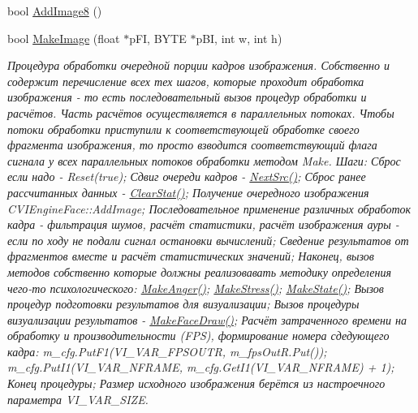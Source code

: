 \begin{DoxyCompactItemize}
bool \hyperlink{class_c_v_i_engine_base_a3fe6ae4f9ac6b9422c22d99878f424f5}{Add\+Image8} ()
\item 
bool \hyperlink{class_c_v_i_engine_base_a3426944a03bac2f5a8c135c217f9cf8c}{Make\+Image} (float $\ast$p\+F\+I, B\+Y\+T\+E $\ast$p\+B\+I, int w, int h)
\begin{DoxyCompactList}\small\item\em Процедура обработки очередной порции кадров изображения. Собственно и содержит перечисление всех тех шагов, которые проходит обработка изображения -\/ то есть последовательный вызов процедур обработки и расчётов. Часть расчётов осуществляется в параллельных потоках. Чтобы потоки обработки приступили к соответствующей обработке своего фрагмента изображения, то просто взводится соответствующий флага сигнала у всех параллельных потоков обработки методом Make. Шаги\+: Сброс если надо -\/ Reset(true); Сдвиг очереди кадров -\/ \hyperlink{class_c_v_i_engine_base_aa1aa2604f40dd77bc49ca6ff8fd81535}{Next\+Src()}; Сброс ранее рассчитанных данных -\/ \hyperlink{class_c_v_i_engine_base_a10d6138a2c8f4c4c946bf930c268be6b}{Clear\+Stat()}; Получение очередного изображения C\+V\+I\+Engine\+Face\+::\+Add\+Image; Последовательное применение различных обработок кадра -\/ фильтрация шумов, расчёт статистики, расчёт изображения ауры -\/ если по ходу не подали сигнал остановки вычислений; Сведение результатов от фрагментов вместе и расчёт статистических значений; Наконец, вызов методов собственно которые должны реализовавать методику определения чего-\/то психологического\+: \hyperlink{class_c_v_i_engine_base_adf949a2b1abf18f519937d3f787c5abf}{Make\+Anger()}; \hyperlink{class_c_v_i_engine_base_a746c67a403f60418bf26e1e686db0c0c}{Make\+Stress()}; \hyperlink{class_c_v_i_engine_base_aa77b261660041465a8d3e68a7088dd0d}{Make\+State()}; Вызов процедур подготовки результатов для визуализации; Вызов процедуры визуализации результатов -\/ \hyperlink{class_c_v_i_engine_base_a18c5dc58d55a37295b3dd4c451fb86fc}{Make\+Face\+Draw()}; Расчёт затраченного времени на обработку и производительности (F\+P\+S), формирование номера сдедующего кадра\+: m\+\_\+cfg.\+Put\+F1(V\+I\+\_\+\+V\+A\+R\+\_\+\+F\+P\+S\+O\+U\+T\+R, m\+\_\+fps\+Out\+R.\+Put()); m\+\_\+cfg.\+Put\+I1(V\+I\+\_\+\+V\+A\+R\+\_\+\+N\+F\+R\+A\+M\+E, m\+\_\+cfg.\+Get\+I1(\+V\+I\+\_\+\+V\+A\+R\+\_\+\+N\+F\+R\+A\+M\+E) + 1); Конец процедуры; Размер исходного изображения берётся из настроечного параметра V\+I\+\_\+\+V\+A\+R\+\_\+\+S\+I\+Z\+E. \end{DoxyCompactList}\item 

\end{DoxyCompactItemize}
